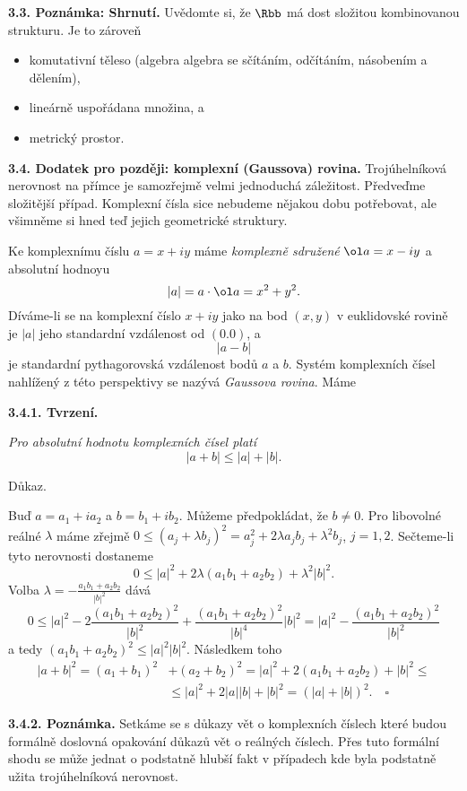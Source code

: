 \documentclass[12pt]{article}
\begin{document}
\medskip

{\bf 3.3. Poznámka: Shrnutí.} Uvědomte si, že $\Rbb$ má dost složitou kombinovanou strukturu. Je to zároveň
\begin{itemize}
\item  komutativní těleso (algebra algebra se sčítáním, odčítáním, násobením a dělením),
\item lineárně uspořádana množina, a
\item metrický prostor. 
\end{itemize}                


\bigskip

{\bf 3.4. Dodatek pro později: komplexní (Gaussova) rovina.} Trojúhelníková nerovnost na přímce je samozřejmě velmi jednoduchá záležitost. Předveďme složitější případ. Komplexní čísla sice nebudeme nějakou dobu potřebovat, ale 
všimněme si hned teď jejich geometrické struktury. 

Ke komplexnímu číslu $a=x+ iy$ máme {\em komplexně sdružené} $\ol a=x-iy$ a absolutní hodnoyu
$$
|a|=a\cdot\ol a=x^2+y^2.
$$
Díváme-li se na komplexní číslo $x+iy$ jako na bod $(x,y)$ v euklidovské rovině je  $|a|$ jeho standardní vzdálenost od  $(0.0)$, a
$$
|a-b|
$$
je standardní pythagorovská vzdálenost bodů $a$ a $b$. Systém komplexních čísel nahlížený z této perspektivy se nazývá {\em Gaussova rovina}. Máme

\medskip

{\bf 3.4.1. Tvrzení.} {\em Pro absolutní hodnotu komplexních čísel platí
$$
|a+b|\leq |a|+|b|.
$$

Důkaz.}
Buď $a=a_1+ia_2$ a $b=b_1+ib_2$. Můžeme předpokládat, že $b\neq 0$. Pro libovolné reálné $\lambda$ máme zřejmě
$0\leq (a_j+\lambda b_j)^2=a_j^2+2\lambda a_jb_j+\lambda^2b_j$, $j=1,2$. Sečteme-li tyto nerovnosti dostaneme
$$
0\leq |a|^2+2\lambda(a_1b_1+a_2b_2)+\lambda^2|b|^2.
$$
Volba $\lambda=-\frac{a_1b_1+a_2b_2}{|b|^2}$ dává
$$
0\leq |a|^2-2\frac{(a_1b_1+a_2b_2)^2}{|b|^2}+\frac{(a_1b_1+a_2b_2)^2}{|b|^4}|b|^2=
|a|^2-\frac{(a_1b_1+a_2b_2)^2}{|b|^2}
$$
a tedy $(a_1b_1+a_2b_2)^2\leq |a|^2|b|^2$. Následkem toho
$$
\begin{aligned}
|a+b|^2=(a_1+b_1)^2&+(a_2+b_2)^2=|a|^2+2(a_1b_1+a_2b_2)+|b|^2\leq\\
                &\leq   |a|^2+2|a||b|+|b|^2=(|a|+|b|)^2.\quad \square 
\end{aligned}                   
$$


\medskip

{\bf 3.4.2. Poznámka.} Setkáme se s důkazy vět o komplexních číslech které budou formálně doslovná opakování důkazů vět o reálných číslech. Přes tuto formální shodu se může jednat o podstatně hlubší fakt v případech kde byla podstatně užita trojúhelníková nerovnost.
\end{document}
